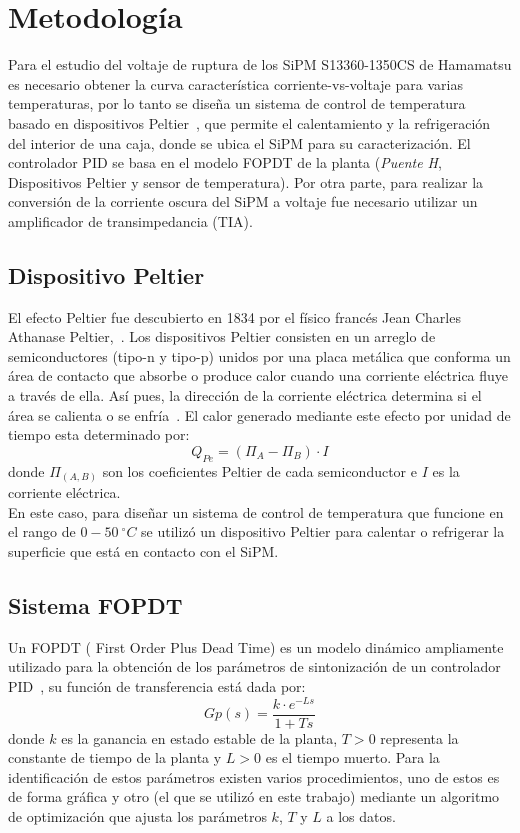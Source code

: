 \documentclass[runningheads]{llncs}
\begin{document}
\section{Metodología}
Para el estudio del voltaje de ruptura de los SiPM S13360-1350CS de Hamamatsu es necesario obtener la curva característica corriente-vs-voltaje para varias temperaturas, por lo tanto se diseña un sistema de control de temperatura basado en dispositivos Peltier~\cite{peltier_physical_principles}, que permite el calentamiento y la refrigeración del interior de una caja, donde se ubica el SiPM para su caracterización. El controlador PID se basa en el modelo FOPDT de la planta (\textit{Puente H}, Dispositivos Peltier y sensor de temperatura). Por otra parte, para realizar la conversión de la corriente oscura del SiPM a voltaje fue necesario utilizar un amplificador de transimpedancia (TIA). 
\subsection{Dispositivo Peltier} 
El efecto Peltier fue descubierto en 1834 por el físico francés Jean Charles Athanase Peltier,~\cite{peltier_theory}. Los dispositivos Peltier consisten en un arreglo de  semiconductores (tipo-n y tipo-p) unidos por una placa metálica que conforma un área de contacto  que absorbe o produce calor cuando una corriente eléctrica fluye a través de ella. Así pues, la dirección de la corriente eléctrica determina si el área se calienta o se enfría~\cite{peltier_physical_principles,Peltier_SIPM}. 
El calor generado mediante este efecto por unidad de tiempo esta determinado por:%
\begin{equation}
Q_{Pe}=(\Pi_{A}-\Pi_{B})\cdot I
\label{peltier_eq}
\end{equation}
donde $\Pi_{(A,B)}$ son los coeficientes Peltier de cada semiconductor e $I$ es la corriente eléctrica.\\
En este caso, para diseñar un sistema de control de temperatura que funcione en el rango de $0-50~^\circ C$ se utilizó un dispositivo Peltier para calentar o refrigerar la superficie que está en contacto con el SiPM. 

\subsection{Sistema FOPDT}
Un FOPDT ( First Order Plus Dead Time) es un modelo dinámico ampliamente utilizado para la obtención de los parámetros de sintonización de un controlador PID~\cite{FOPDT}, su función de transferencia está dada por:
\begin{equation}
Gp(s)=  \frac{k\cdot e^{-Ls}}{1+Ts}
\end{equation}
donde $k$ es la ganancia en estado estable de la planta, $T > 0$  representa la constante de tiempo de la planta y $L > 0$ es el tiempo muerto. Para la identificación de estos parámetros existen varios procedimientos, uno de estos es de forma gráfica y otro (el que se utilizó en este trabajo) mediante un algoritmo de optimización que ajusta los parámetros $k$, $T$ y $L$ a los datos.  
\end{document}

